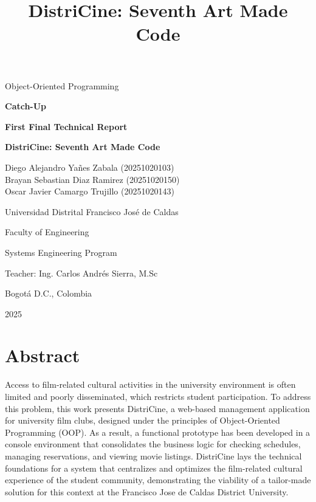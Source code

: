 \documentclass[12pt]{article}
\title{DistriCine: Seventh Art Made Code}
\author{}
\date{}
\begin{document}
\begin{titlepage}
    \centering
    \vspace*{1.5cm}
    {\Large Object-Oriented Programming \par}
    \vfill
    {\bfseries\LARGE Catch-Up \par}
    {\bfseries\LARGE First Final Technical Report\par}
    {\bfseries\LARGE DistriCine: Seventh Art Made Code\par}
    \vfill
    {\large
        Diego Alejandro Yañes Zabala (20251020103) \\ 
        Brayan Sebastian Diaz Ramirez (20251020150) \\
        Oscar Javier Camargo Trujillo (20251020143) \par
    }
    \vfill
    {\Large Universidad Distrital Francisco José de Caldas \par}
    \vspace{1.5cm}
    {\large Faculty of Engineering \par}
    {\large Systems Engineering Program \par}
    {\large Teacher: Ing. Carlos Andrés Sierra, M.Sc \par}
    {\large Bogotá D.C., Colombia \par}
    {\large 2025 \par}
\end{titlepage}

\tableofcontents
\newpage

\section{Abstract}
Access to film-related cultural activities in the university environment is often limited and poorly disseminated, which restricts student participation. To address this problem, this work presents DistriCine, a web-based management application for university film clubs, designed under the principles of Object-Oriented Programming (OOP). As a result, a functional prototype has been developed in a console environment that consolidates the business logic for checking schedules, managing reservations, and viewing movie listings. DistriCine lays the technical foundations for a system that centralizes and optimizes the film-related cultural experience of the student community, demonstrating the viability of a tailor-made solution for this context at the Francisco Jose de Caldas District University.
\end{document}

